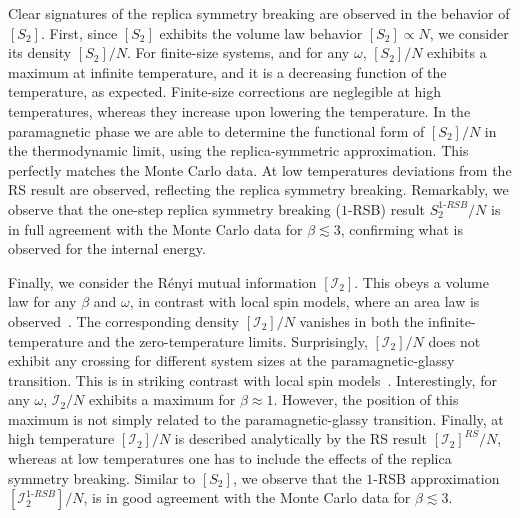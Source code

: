 \documentclass[twocolumn,superscriptaddress,prb,10pt]{revtex4-1}
\begin{document}
Clear signatures of the replica symmetry breaking are observed in the behavior of $[S_2]$. 
First, since $[S_2]$ exhibits the volume law behavior $[S_2]\propto N$, 
we consider its density $[S_2]/N$. For finite-size systems, and for any $\omega$, $[S_2]/N$ 
exhibits a maximum at infinite temperature, and it is a decreasing function of the temperature, 
as expected. Finite-size corrections are neglegible at high temperatures, whereas they increase 
upon lowering the temperature. In the paramagnetic phase we are able to determine the functional 
form of $[S_2]/N$ in the thermodynamic limit, using the replica-symmetric approximation. This 
perfectly matches the Monte Carlo data. At low temperatures deviations from the RS result are 
observed, reflecting the replica symmetry breaking. Remarkably, we observe that the one-step 
replica symmetry breaking ($1$-RSB) result $S_2^{1\textrm{-}RSB}/N$ is in full agreement with 
the Monte Carlo data for $\beta\lesssim 3$, confirming what is observed for the internal 
energy. 

Finally, we consider the R\'enyi mutual information $[{\mathcal I}_2]$. This obeys a volume 
law for any $\beta$ and $\omega$, in contrast with local spin models, where an area law is 
observed~\cite{wolf-2008}. The corresponding density $[{\mathcal I}_2]/N$ vanishes in 
both the infinite-temperature and the zero-temperature limits. Surprisingly, $[{\mathcal I}_2]/N$ 
does not exhibit any crossing for different system sizes at the paramagnetic-glassy transition.
This is in striking contrast with local spin models~\cite{jaconis-2013}. Interestingly, for 
any $\omega$, ${\mathcal I}_2/N$ exhibits a maximum for $\beta\approx 1$. However, the 
position of this maximum is not simply related to the paramagnetic-glassy transition. Finally, 
at high temperature $[{\mathcal I}_2]/N$ is described analytically by the RS result 
$[{\mathcal I}_2]^{RS}/N$, whereas at low temperatures one has to include the effects of the 
replica symmetry breaking. Similar to $[S_2]$, we observe that the $1$-RSB approximation 
$[{\mathcal I}^{1\textrm{-}RSB}_2]/N$, is in good agreement with the Monte Carlo data 
for $\beta\lesssim 3$.
\end{document}
